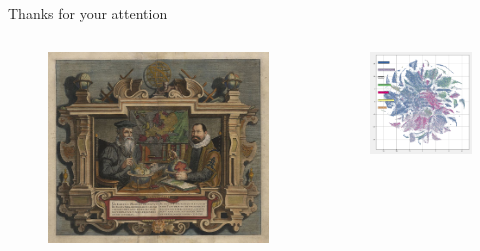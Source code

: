 \documentclass[9pt]{beamer}
\begin{document}
\begin{frame}{Thanks for your attention}
\begin{columns}
	\begin{column}{0.5\linewidth}
						\begin{figure}
			\includegraphics[width=1\linewidth]{../plots/Hondius_Portrait_of_map-makers}
		\end{figure}
	\end{column}
	\begin{column}{0.5\linewidth}
			\begin{figure}
		\begin{center}
			\includegraphics[width=1\linewidth]{../tsne_results/plots/run_1429_s_0_p50_oecds.png}
		\end{center}
	\end{figure}
	\end{column}
\end{columns}
\end{frame}
\end{document}
